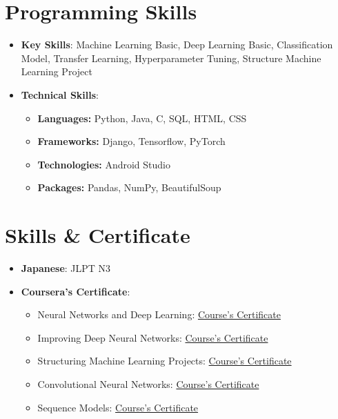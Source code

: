 \documentclass[letterpaper,11pt]{article}
\newcommand{\resumeSubHeadingListStart}{\begin{itemize}[leftmargin=*]}
\newcommand{\resumeSubHeadingListEnd}{\end{itemize}}
\begin{document}
%
\section{Programming Skills}
\resumeSubHeadingListStart
\item \textbf{Key Skills}{: Machine Learning Basic, Deep Learning Basic, Classification Model, Transfer Learning, Hyperparameter Tuning, Structure Machine Learning Project}
\item \textbf{Technical Skills}{:}
\begin{itemize}
	\item \textbf{Languages: }Python, Java, C, SQL, HTML, CSS
	\item \textbf{Frameworks: }Django, Tensorflow, PyTorch
	\item \textbf{Technologies: }Android Studio
	\item \textbf{Packages: }Pandas, NumPy, BeautifulSoup
\end{itemize}
\resumeSubHeadingListEnd


\section{Skills \& Certificate}
\resumeSubHeadingListStart
\item \textbf{Japanese}{: JLPT N3}
\item \textbf{Coursera's Certificate}{: }
\begin{itemize}
	\item Neural Networks and Deep Learning: \href{https://www.coursera.org/account/accomplishments/verify/3SV6ZM83PAPY}{Course's Certificate}
	\item Improving Deep Neural Networks: \href{https://www.coursera.org/account/accomplishments/verify/K7R7RXN6Q7SV}{Course's Certificate}
	\item Structuring Machine Learning Projects: \href{https://www.coursera.org/account/accomplishments/verify/LDATR4NBCUGX}{Course's Certificate}
	\item Convolutional Neural Networks: \href{https://www.coursera.org/account/accomplishments/verify/V5T79CX4DHVH}{Course's Certificate}
	\item Sequence Models: \href{https://coursera.org/share/9426110071f6af536da81856863076c5}{Course's Certificate}
\end{itemize}
\resumeSubHeadingListEnd


\end{document}
